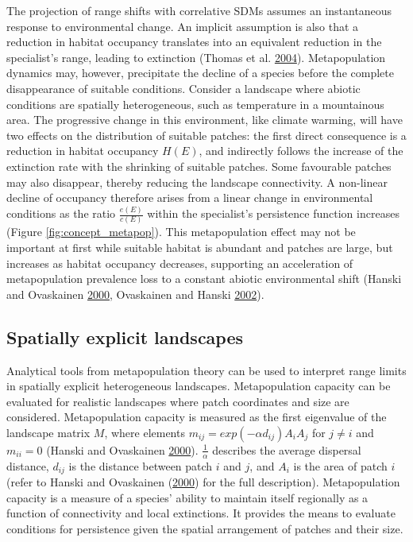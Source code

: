 \documentclass[12pt]{article}
\begin{document}
The projection of range shifts with correlative SDMs assumes an
instantaneous response to environmental change. An implicit assumption
is also that a reduction in habitat occupancy translates into an
equivalent reduction in the specialist's range, leading to extinction
(Thomas et al. \protect\hyperlink{ref-thomas_extinction_2004}{2004}).
Metapopulation dynamics may, however, precipitate the decline of a
species before the complete disappearance of suitable conditions.
Consider a landscape where abiotic conditions are spatially
heterogeneous, such as temperature in a mountainous area. The
progressive change in this environment, like climate warming, will have
two effects on the distribution of suitable patches: the first direct
consequence is a reduction in habitat occupancy \(H(E)\), and indirectly
follows the increase of the extinction rate with the shrinking of
suitable patches. Some favourable patches may also disappear, thereby
reducing the landscape connectivity. A non-linear decline of occupancy
therefore arises from a linear change in environmental conditions as the
ratio \(\frac{e(E)}{c(E)}\) within the specialist's persistence function
increases (Figure \ref{fig:concept_metapop}). This metapopulation effect
may not be important at first while suitable habitat is abundant and
patches are large, but increases as habitat occupancy decreases,
supporting an acceleration of metapopulation prevalence loss to a
constant abiotic environmental shift (Hanski and Ovaskainen
\protect\hyperlink{ref-hanski_metapopulation_2000}{2000}, Ovaskainen and
Hanski \protect\hyperlink{ref-ovaskainen_transient_2002}{2002}).

\hypertarget{spatially-explicit-landscapes}{%
\subsection{Spatially explicit
landscapes}\label{spatially-explicit-landscapes}}

Analytical tools from metapopulation theory can be used to interpret
range limits in spatially explicit heterogeneous landscapes.
Metapopulation capacity can be evaluated for realistic landscapes where
patch coordinates and size are considered. Metapopulation capacity is
measured as the first eigenvalue of the landscape matrix \(M\), where
elements \(m_{ij} = exp(-\alpha d_{ij})A_{i}A_{j}\) for \(j \neq i\) and
\(m_{ii} = 0\) (Hanski and Ovaskainen
\protect\hyperlink{ref-hanski_metapopulation_2000}{2000}).
\(\frac{1}{\alpha}\) describes the average dispersal distance,
\(d_{ij}\) is the distance between patch \(i\) and \(j\), and \(A_{i}\)
is the area of patch \(i\) (refer to Hanski and Ovaskainen
(\protect\hyperlink{ref-hanski_metapopulation_2000}{2000}) for the full
description). Metapopulation capacity is a measure of a species' ability
to maintain itself regionally as a function of connectivity and local
extinctions. It provides the means to evaluate conditions for
persistence given the spatial arrangement of patches and their size.
\end{document}
